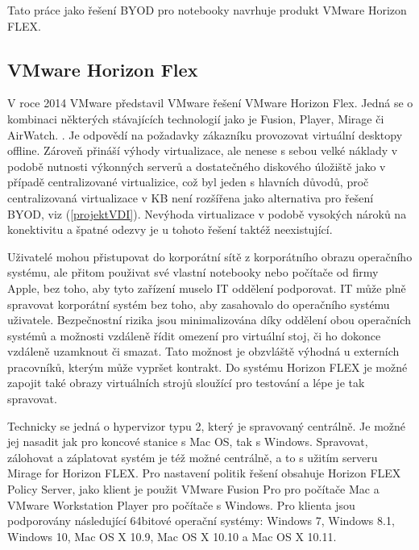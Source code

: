 Tato práce jako řešení BYOD pro notebooky navrhuje produkt VMware Horizon FLEX.



\subsection{VMware Horizon Flex}
V roce 2014 VMware představil VMware řešení VMware Horizon Flex. Jedná se o kombinaci některých stávajících technologií jako je Fusion, Player, Mirage či AirWatch. 
. Je odpovědí na požadavky zákazníku provozovat virtuální desktopy offline. Zároveň přináší výhody virtualizace, ale nenese s sebou velké náklady v podobě nutnosti výkonných serverů a dostatečného diskového úložiště jako v případě centralizované virtualizice, což byl jeden s hlavních důvodů, proč centralizovaná virtualizace v KB není rozšířena jako alternativa pro řešení BYOD, viz (\ref{projektVDI}). Nevýhoda virtualizace v podobě vysokých nároků na konektivitu a špatné odezvy je u tohoto řešení taktéž neexistující. 

Uživatelé mohou přistupovat do korporátní sítě z korporátního obrazu operačního systému, ale přitom použivat své vlastní notebooky nebo počítače od firmy Apple, bez toho, aby tyto zařízení muselo IT oddělení podporovat. IT může plně spravovat korporátní systém bez toho, aby zasahovalo do operačního systému uživatele. Bezpečnostní rizika jsou minimalizována díky oddělení obou operačních systémů a možnosti vzdáleně řídit omezení pro virtuální stoj, či ho dokonce vzdáleně uzamknout či smazat. Tato možnost je obzvláště výhodná u externích pracovníků, kterým může vypršet kontrakt. Do systému Horizon FLEX je možné zapojit také obrazy virtuálních strojů sloužící pro testování a lépe je tak spravovat.

Technicky se jedná o hypervizor typu 2, který je spravovaný centrálně. Je možné jej nasadit jak pro koncové stanice s Mac OS, tak s Windows. Spravovat, zálohovat a záplatovat systém je též možné centrálně, a to s užitím serveru Mirage for Horizon FLEX. Pro nastavení politik řešení obsahuje Horizon FLEX Policy Server, jako klient je použit VMware Fusion Pro pro počítače Mac a VMware Workstation Player pro počítače s Windows.  
Pro klienta jsou podporovány následující 64bitové operační systémy: Windows 7, Windows 8.1, Windows 10, Mac OS X 10.9, Mac OS X 10.10 a Mac OS X 10.11.

